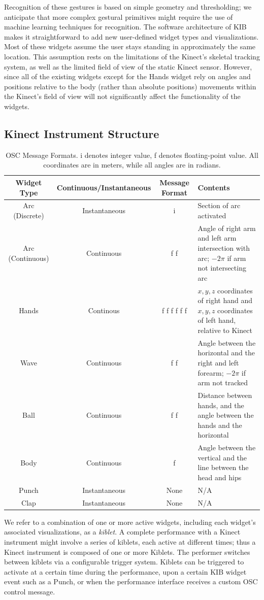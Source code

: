 \documentclass{nime-alternate}
\begin{document}
Recognition of these gestures is based on simple geometry and thresholding; we anticipate that more complex
gestural primitives might require the use of machine learning techniques for recognition.
The software architecture of KIB makes it straightforward to add new user-defined widget types and visualizations. 
Most of these widgets assume the user stays standing in approximately the same
location. This assumption rests on the limitations of the Kinect's skeletal tracking system,
as well as the limited field of view of the static Kinect sensor. However, since all of the
existing widgets except for the Hands widget rely on angles and positions relative to the body (rather than
absolute positions) movements within the Kinect's field of view will not significantly affect the
functionality of the widgets.

\subsection{Kinect Instrument Structure}
\begin{table}
\centering
\caption{OSC Message Formats. i denotes integer value, f denotes floating-point value. All coordinates are in meters, while all angles are in radians.}
\begin{tabular}{|c|c|c|p{}|} \hline
\textbf{Widget Type} & \textbf{Continuous/Instantaneous} & \textbf{Message Format} & \textbf{Contents}\\ \hline
Arc (Discrete) & Instantaneous & i & Section of arc activated\\ \hline
Arc (Continuous) & Continuous & f f& Angle of right arm and left arm intersection with arc; $-2\pi$ if arm not intersecting arc\\ \hline
Hands & Continous & f f f f f f & $x,y,z$ coordinates of right hand and $x,y,z$ coordinates of left hand, relative to Kinect \\ \hline
Wave & Continuous & f f & Angle between the horizontal and the right and left forearm; $-2\pi$ if arm not tracked\\ \hline
Ball & Continuous & f f & Distance between hands, and the angle between the hands
and the horizontal\\ \hline
Body & Continuous & f & Angle between the vertical and the line between the head and hips\\ \hline
Punch & Instantaneous & None & N/A \\ \hline
Clap & Instantaneous & None & N/A \\ \hline
\end{tabular}
\label{tab:osc}
\end{table}
We refer to a combination of one or more active widgets, including each widget's associated visualizations, as a 
\textit{kiblet}. A complete performance with a Kinect instrument might involve a series 
of kiblets, each active at different times; thus a Kinect instrument is composed of one or more Kiblets. 
The performer switches between kiblets via a
configurable trigger system. Kiblets can be triggered to activate at a certain time during the
performance, upon a certain KIB widget event such as a Punch, or when the performance interface
receives a custom OSC control message. 
\end{document}
